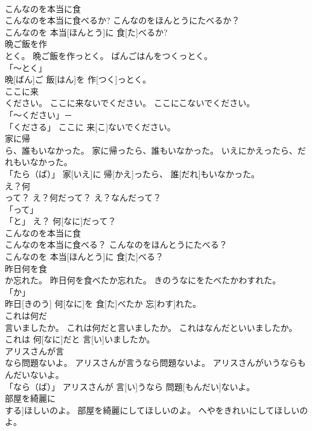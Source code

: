 \documentclass[8pt]{extreport}
\begin{document}
\begin{CJK}{UTF8}{min}
\\	こんなのを本当に食
\\	こんなのを本当に食べるか?	こんなのをほんとうにたべるか？	
\\	こんなのを 本当[ほんとう]に 食[た]べるか?		
\\	晩ご飯を作
\\	とく。	晩ご飯を作っとく。	ばんごはんをつくっとく。	
\\	「～とく」 
\\	晩[ばん]ご 飯[はん]を 作[つく]っとく。		
\\	ここに来
\\	ください。	ここに来ないでください。	ここにこないでください。	
\\	「～ください」－ 
\\	「くださる」	ここに 来[こ]ないでください。		
\\	家に帰
\\	ら、誰もいなかった。	家に帰ったら、誰もいなかった。	いえにかえったら、だれもいなかった。	
\\	「たら（ば）」	家[いえ]に 帰[かえ]ったら、 誰[だれ]もいなかった。		
\\	え？何
\\	って？	え？何だって？	え？なんだって？	
\\	「って」 
\\	「と」	え？ 何[なに]だって？		
\\	こんなのを本当に食
\\	こんなのを本当に食べる？	こんなのをほんとうにたべる？	
\\	こんなのを 本当[ほんとう]に 食[た]べる？		
\\	昨日何を食
\\	か忘れた。	昨日何を食べたか忘れた。	きのうなにをたべたかわすれた。	
\\	「か」 
\\	昨日[きのう] 何[なに]を 食[た]べたか 忘[わす]れた。		
\\	これは何だ
\\	言いましたか。	これは何だと言いましたか。	これはなんだといいましたか。	
\\	これは 何[なに]だと 言[い]いましたか。		
\\	アリスさんが言
\\	なら問題ないよ。	アリスさんが言うなら問題ないよ。	アリスさんがいうならもんだいないよ。	
\\	「なら（ば）」	アリスさんが 言[い]うなら 問題[もんだい]ないよ。		
\\	部屋を綺麗に
\\	する]ほしいのよ。	部屋を綺麗にしてほしいのよ。	へやをきれいにしてほしいのよ。	

\end{CJK}
\end{document}
